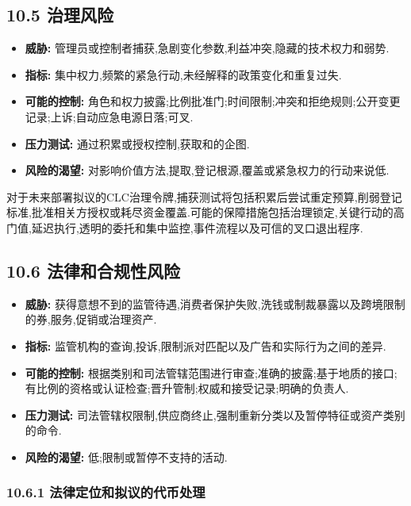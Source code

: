 \documentclass[11pt]{article}
\begin{document}
\subsection*{10.5 治理风险}

\begin{itemize}[leftmargin=*]
\item \textbf{威胁:} 管理员或控制者捕获,急剧变化参数,利益冲突,隐藏的技术权力和弱势.
\item \textbf{指标:} 集中权力,频繁的紧急行动,未经解释的政策变化和重复过失.
\item \textbf{可能的控制:} 角色和权力披露;比例批准门;时间限制;冲突和拒绝规则;公开变更记录;上诉;自动应急电源日落;可叉.
\item \textbf{压力测试:} 通过积累或授权控制,获取和的企图.
\item \textbf{风险的渴望:} 对影响价值方法,提取,登记根源,覆盖或紧急权力的行动来说低.
\end{itemize}
对于未来部署拟议的CLC治理令牌,捕获测试将包括积累后尝试重定预算,削弱登记标准,批准相关方授权或耗尽资金覆盖.可能的保障措施包括治理锁定,关键行动的高门值,延迟执行,透明的委托和集中监控,事件流程以及可信的叉口退出程序.

\subsection*{10.6 法律和合规性风险}

\begin{itemize}[leftmargin=*]
\item \textbf{威胁:} 获得意想不到的监管待遇,消费者保护失败,洗钱或制裁暴露以及跨境限制的券,服务,促销或治理资产.
\item \textbf{指标:} 监管机构的查询,投诉,限制派对匹配以及广告和实际行为之间的差异.
\item \textbf{可能的控制:} 根据类别和司法管辖范围进行审查;准确的披露;基于地质的接口;有比例的资格或认证检查;晋升管制;权威和接受记录;明确的负责人.
\item \textbf{压力测试:} 司法管辖权限制,供应商终止,强制重新分类以及暂停特征或资产类别的命令.
\item \textbf{风险的渴望:} 低;限制或暂停不支持的活动.
\end{itemize}
\subsubsection*{10.6.1 法律定位和拟议的代币处理}
\end{document}
